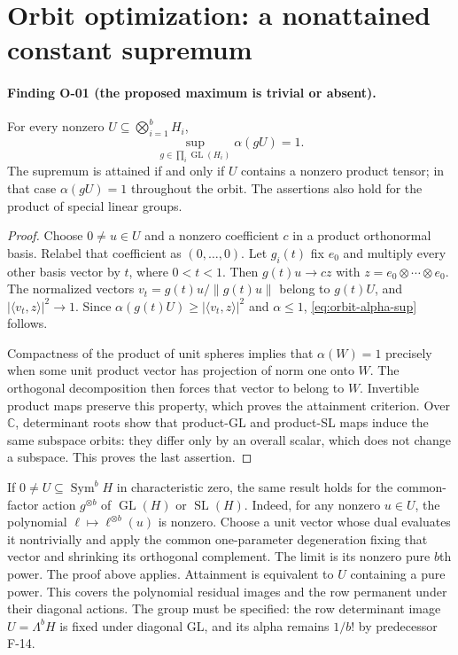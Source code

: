 \section{Orbit optimization: a nonattained constant supremum}
\label{sec:orbit-alpha}

\paragraph{Finding O-01 (the proposed maximum is trivial or absent).}
For every nonzero $U\subseteq\bigotimes_{i=1}^b H_i$,
\begin{equation}\label{eq:orbit-alpha-sup}
 \sup_{g\in\prod_i\operatorname{GL}(H_i)}\alpha(gU)=1.
\end{equation}
The supremum is attained if and only if $U$ contains a nonzero
product tensor; in that case $\alpha(gU)=1$ throughout the orbit.
The assertions also hold for the product of special linear groups.

\begin{proof}
Choose $0\ne u\in U$ and a nonzero coefficient $c$ in a product
orthonormal basis. Relabel that coefficient as $(0,\ldots,0)$.
Let $g_i(t)$ fix $e_0$ and multiply every other basis vector by
$t$, where $0<t<1$. Then
$g(t)u\longrightarrow c z$ with $z=e_0\otimes\cdots\otimes e_0$.
The normalized vectors $v_t=g(t)u/\|g(t)u\|$ belong to $g(t)U$,
and $|\langle v_t,z\rangle|^2\longrightarrow1$.
Since $\alpha(g(t)U)\geq|\langle v_t,z\rangle|^2$ and
$\alpha\leq1$, \eqref{eq:orbit-alpha-sup} follows.

Compactness of the product of unit spheres implies that
$\alpha(W)=1$ precisely when some unit product vector has
projection of norm one onto $W$. The orthogonal decomposition
then forces that vector to belong to $W$. Invertible product
maps preserve this property, which proves the attainment
criterion. Over $\mathbb C$, determinant roots show that
product-GL and product-SL maps induce the same subspace orbits:
they differ only by an overall scalar, which does not change
a subspace. This proves the last assertion.
\end{proof}

If $0\ne U\subseteq\operatorname{Sym}^b H$ in characteristic
zero, the same result holds for the common-factor action
$g^{\otimes b}$ of $\operatorname{GL}(H)$ or $\operatorname{SL}(H)$.
Indeed, for any nonzero $u\in U$, the polynomial
$\ell\mapsto\ell^{\otimes b}(u)$ is nonzero. Choose a unit vector
whose dual evaluates it nontrivially and apply the common
one-parameter degeneration fixing that vector and shrinking
its orthogonal complement. The limit is its nonzero pure
$b$th power. The proof above applies. Attainment is equivalent
to $U$ containing a pure power. This covers the polynomial
residual images and the row permanent under their diagonal
actions. The group must be specified: the row determinant
image $U=\Lambda^b H$ is fixed under diagonal GL, and its
alpha remains $1/b!$ by predecessor F-14.

